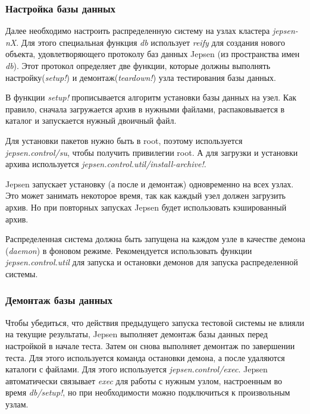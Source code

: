 \documentclass[12pt,  openany]{book}
\begin{document}
\subsubsection{Настройка базы данных}
Далее необходимо настроить распределенную систему на узлах кластера \textit{jepsen-nX}.  Для этого специальная функция \textit{db} использует \textit{reify} для создания нового объекта, удовлетворяющего протоколу баз данных Jepsen (из пространства имен \textit{db}).  Этот протокол определяет две функции, которые должны выполнять настройку(\textit{setup!}) и демонтаж(\textit{teardown!}) узла тестирования базы данных.
\par В функции \textit{setup!} прописывается алгоритм установки базы данных на узел. Как правило, сначала загружается архив в нужными файлами, распаковывается в каталог и запускается нужный двоичный файл.
\par Для установки пакетов нужно быть в  root,  поэтому используется \textit{jepsen.control/su}, чтобы получить привилегии root.  А для загрузки и установки архива используется \textit{jepsen.control.util/install-archive!}. 
\par  Jepsen запускает установку (а после и демонтаж) одновременно на всех узлах. Это может занимать некоторое время, так как каждый узел должен загрузить архив. Но при повторных запусках Jepsen будет использовать кэшированный архив.
\par Распределенная система должна быть запущена на каждом узле в качестве демона (\textit{daemon}) в фоновом режиме. Рекомендуется использовать функции \textit{jepsen.control.util} для запуска и остановки демонов для запуска распределенной системы.

\subsubsection{Демонтаж базы данных}
Чтобы убедиться, что действия предыдущего запуска тестовой системы не влияли на текущие результаты, Jepsen выполняет демонтаж базы данных перед настройкой в начале теста.  Затем он снова выполняет демонтаж по завершении теста.  Для этого используется команда остановки демона, а после удаляются каталоги с файлами. Для этого используется \textit{jepsen.control/exec}.  Jepsen автоматически связывает \textit{exec} для работы с нужным узлом, настроенным во время \textit{db/setup!}, но при необходимости  можно подключиться к произвольным узлам.
\end{document}

